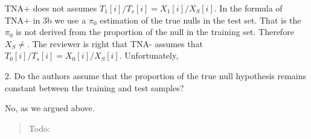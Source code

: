 \documentclass{article}
\newcommand{\response}[1]{\vspace*{1ex} \color{blue} \noindent #1 \color{black}
\vspace*{2ex}}
\newcommand{\edit}[1]{\begin{quotation}\color{red}\noindent #1
\color{black}\end{quotation}}
\begin{document}
\response{TNA+ does not assumes $T_1[i]/T_s[i]= X_1[i]/X_S[i]$. In the formula of TNA+ in 3b we use a $\pi_0$ estimation of the true nulls in the test set. That is the $\pi_0$ is not derived from the proportion of the null in the training set. Therefore $X_S \ne  $. The reviewer is right that TNA- assumes that $T_0[i]/T_s[i]= X_0[i]/X_S[i]$. Unfortunately,  }



2. Do the authors assume that the proportion of the true null hypothesis remains constant between the training and test samples?


\response{No, as we argued above.}


\edit{Todo:}



\end{document}
